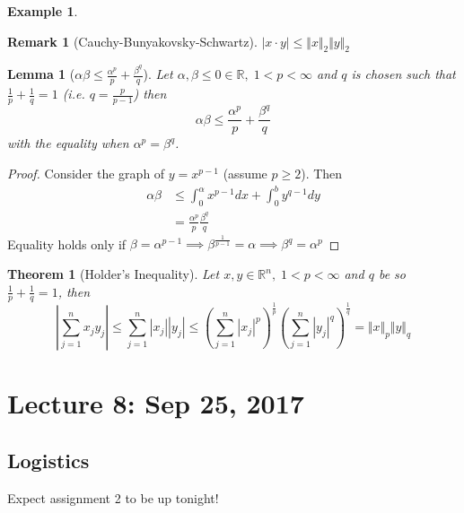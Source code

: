 \documentclass[11pt, oneside]{book}
\theoremstyle{break}
\newtheorem{thm}{Theorem}[section]
\newtheorem*{proof}{Proof}
\newtheorem{lemma}{Lemma}[section]
\newtheorem*{remark}{Remark}
\newtheorem{eg}{Example}[section]
\newcommand{\bb}[1]{\mathbb{#1}}			%
\begin{document}
\begin{eg}
\begin{enumerate}
	\end{enumerate}
\end{eg}

\begin{remark}[Cauchy-Bunyakovsky-Schwartz]
	$|x \cdot y| \leq \Vert x\Vert _2 \Vert y\Vert _2$
\end{remark}

\begin{lemma}[$\alpha\beta \leq \frac{\alpha^p}{p} + \frac{\beta^q}{q}$]\label{lemma:alphabeta}
	Let $\alpha, \beta \leq 0 \in \bb{R}, \; 1 < p < \infty$ and $q$ is chosen such that $\frac{1}{p} + \frac{1}{q} = 1$ (i.e. $q = \frac{p}{p - 1}$) then
	\begin{equation}
		\alpha\beta \leq \frac{\alpha^p}{p} + \frac{\beta^q}{q}
	\end{equation}
	with the equality when $\alpha^p = \beta^q$.
\end{lemma}

\begin{proof}
	Consider the graph of $y = x^{p - 1}$ (assume $p \geq 2$). Then
	\begin{align*}
		\alpha\beta &\leq \int_{0}^{\alpha} x^{p - 1} dx + \int_{0}^{b} y^{q - 1} dy \\
								&= \frac{\alpha^p}{p} \frac{\beta^q}{q}
	\end{align*}
	Equality holds only if $\beta = \alpha^{p - 1} \implies \beta^{\frac{1}{p-1}} = \alpha \implies \beta^q = \alpha^p$
\end{proof}

\begin{thm}[Holder's Inequality]\label{thm:holder}
	Let $x, y \in \bb{R}^n, \; 1 < p < \infty$ and $q$ be so $\frac{1}{p} + \frac{1}{q} = 1$, then
	\begin{equation}
		\left| \sum_{j=1}^{n} x_j y_j \right| \leq \sum_{j=1}^{n} |x_j| |y_j| \leq \left( \sum_{j=1}^{n} |x_j|^p \right)^\frac{1}{p} \left(\sum_{j=1}^{n} |y_j|^q \right)^\frac{1}{q} = \Vert x\Vert _p \Vert y\Vert _q
	\end{equation}
\end{thm}

\chapter{Lecture 8: Sep 25, 2017}\label{chp:lec8}

\section{Logistics}
Expect assignment 2 to be up tonight!
\end{document}
